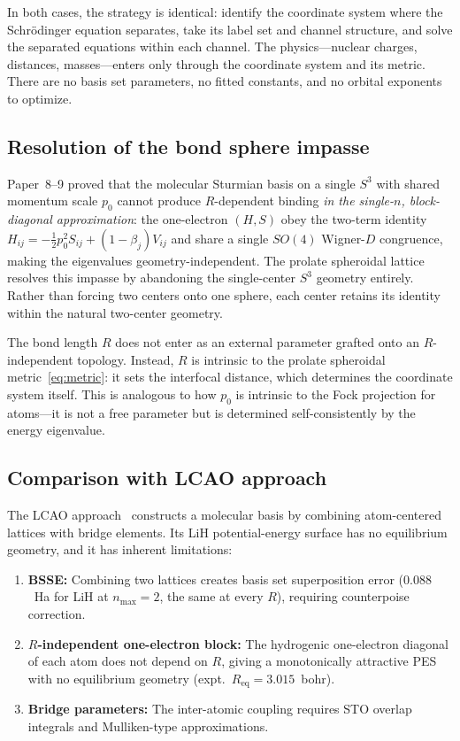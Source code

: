 \documentclass[aps,pra,twocolumn,superscriptaddress,longbibliography]{revtex4-2}
\begin{document}
In both cases, the strategy is identical: identify the coordinate
system where the Schr\"odinger equation separates, take its label set
and channel structure, and solve the separated equations within each
channel.  The physics---nuclear charges, distances,
masses---enters only through the coordinate system and its metric.
There are no basis set parameters, no fitted constants, and no
orbital exponents to optimize.

\subsection{Resolution of the bond sphere impasse}

Paper~8--9 proved that the molecular Sturmian basis on a single
$S^3$ with shared momentum scale $p_0$ cannot produce
$R$-dependent binding \emph{in the single-$n$, block-diagonal approximation}: the one-electron $(H,S)$ obey the two-term
identity $H_{ij} = -\tfrac12 p_0^2 S_{ij} + (1-\beta_j)V_{ij}$ and
share a single $SO(4)$ Wigner-$D$ congruence, making the eigenvalues
geometry-independent.  The
prolate spheroidal lattice resolves this impasse by abandoning
the single-center $S^3$ geometry entirely.  Rather than forcing
two centers onto one sphere, each center retains its identity
within the natural two-center geometry.

The bond length $R$ does not enter as an external parameter grafted
onto an $R$-independent topology.  Instead, $R$ is intrinsic to the
prolate spheroidal metric~\eqref{eq:metric}: it sets the interfocal
distance, which determines the coordinate system itself.  This is
analogous to how $p_0$ is intrinsic to the Fock projection for
atoms---it is not a free parameter but is determined self-consistently
by the energy eigenvalue.

\subsection{Comparison with LCAO approach}

The LCAO approach~\cite{loutey_lcao_fci} constructs a molecular
basis by combining atom-centered lattices with bridge elements.
Its LiH potential-energy surface has no equilibrium geometry, and it
has inherent limitations:
\begin{enumerate}
  \item \textbf{BSSE:} Combining two lattices creates basis set
    superposition error ($0.088$~Ha for LiH at $n_{\max} = 2$, the same at
    every $R$),
    requiring counterpoise correction.
  \item \textbf{$R$-independent one-electron block:} The hydrogenic
    one-electron diagonal of each atom does not depend on $R$,
    giving a monotonically attractive PES with no equilibrium
    geometry (expt.\ $R_{\mathrm{eq}} = 3.015$~bohr).
  \item \textbf{Bridge parameters:} The inter-atomic coupling
    requires STO overlap integrals and Mulliken-type approximations.
\end{enumerate}
\end{document}
